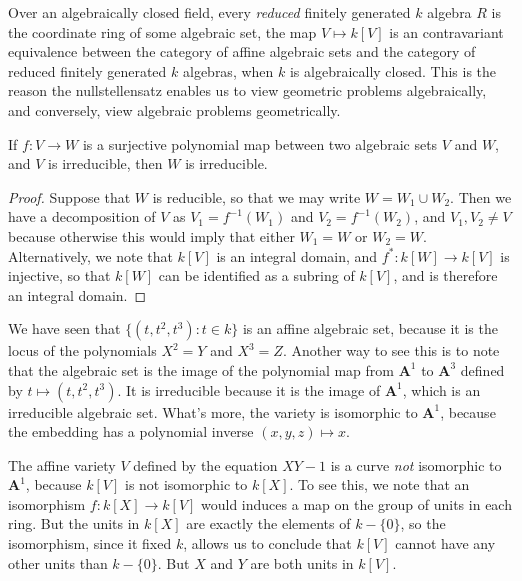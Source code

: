 Over an algebraically closed field, every \emph{reduced} finitely generated $k$ algebra $R$ is the coordinate ring of some algebraic set, the map $V \mapsto k[V]$ is an contravariant equivalence between the category of affine algebraic sets and the category of reduced finitely generated $k$ algebras, when $k$ is algebraically closed. This is the reason the nullstellensatz enables us to view geometric problems algebraically, and conversely, view algebraic problems geometrically.

\begin{prop}
    If $f: V \to W$ is a surjective polynomial map between two algebraic sets $V$ and $W$, and $V$ is irreducible, then $W$ is irreducible.
\end{prop}
\begin{proof}
    Suppose that $W$ is reducible, so that we may write $W = W_1 \cup W_2$. Then we have a decomposition of $V$ as $V_1 = f^{-1}(W_1)$ and $V_2 = f^{-1}(W_2)$, and $V_1, V_2 \neq V$ because otherwise this would imply that either $W_1 = W$ or $W_2 = W$. Alternatively, we note that $k[V]$ is an integral domain, and $f^*: k[W] \to k[V]$ is injective, so that $k[W]$ can be identified as a subring of $k[V]$, and is therefore an integral domain.
\end{proof}

\begin{example}
    We have seen that $\{ (t,t^2,t^3): t \in k \}$ is an affine algebraic set, because it is the locus of the polynomials $X^2 = Y$ and $X^3 = Z$. Another way to see this is to note that the algebraic set is the image of the polynomial map from $\mathbf{A}^1$ to $\mathbf{A}^3$ defined by $t \mapsto (t,t^2,t^3)$. It is irreducible because it is the image of $\mathbf{A}^1$, which is an irreducible algebraic set. What's more, the variety is isomorphic to $\mathbf{A}^1$, because the embedding has a polynomial inverse $(x,y,z) \mapsto x$.
\end{example}

\begin{example}
    The affine variety $V$ defined by the equation $XY - 1$ is a curve {\it not} isomorphic to $\mathbf{A}^1$, because $k[V]$ is not isomorphic to $k[X]$. To see this, we note that an isomorphism $f: k[X] \to k[V]$ would induces a map on the group of units in each ring. But the units in $k[X]$ are exactly the elements of $k - \{ 0 \}$, so the isomorphism, since it fixed $k$, allows us to conclude that $k[V]$ cannot have any other units than $k - \{ 0 \}$. But $X$ and $Y$ are both units in $k[V]$.
\end{example}

